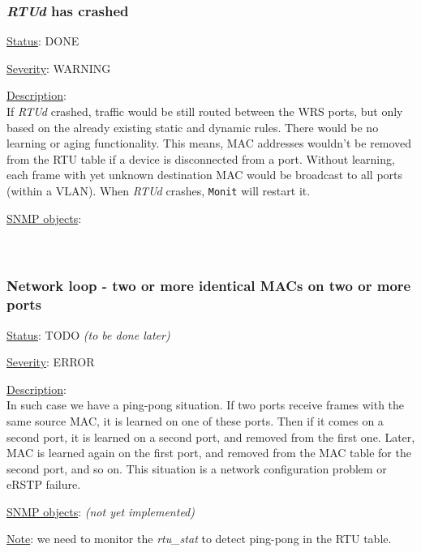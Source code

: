 \subsubsection{\bf \emph{RTUd} has crashed}
		\label{fail:data:rtu_crash}
		\begin{packed_enum}
			\item [] \underline{Status}: DONE
			\item [] \underline{Severity}: WARNING
			\item [] \underline{Description}:\\
				If \emph{RTUd} crashed, traffic would be still routed between the WRS ports, but
				only based on the already existing static and dynamic rules. There would be
				no learning or aging functionality. This means, MAC addresses wouldn't be
				removed from the RTU table if a device is disconnected from a port.
				Without learning, each frame with yet unknown destination MAC would be
				broadcast to all ports (within a VLAN). When \emph{RTUd} crashes,
				\texttt{Monit} will restart it.
			\item [] \underline{SNMP objects}:\\
				\\
				\\
		\end{packed_enum}

\subsubsection{\bf Network loop - two or more identical MACs on two or more ports}
		\label{fail:data:net_loop}
		\begin{packed_enum}
			\item [] \underline{Status}: TODO \emph{(to be done later)}
			\item [] \underline{Severity}: ERROR
			\item [] \underline{Description}:\\
				In such case we have a ping-pong situation. If two ports receive frames
				with the same source MAC, it is learned on one of these ports. Then if
				it comes on a second port, it is learned on a second port, and removed
				from the first one. Later, MAC is learned again on the first port, and
				removed from the MAC table for the second port, and so on. This
				situation is a network configuration problem or eRSTP failure.
			\item [] \underline{SNMP objects}: \emph{(not yet implemented)}
			\item [] \underline{Note}: we need to monitor the \emph{rtu\_stat} to
				detect ping-pong in the RTU table.
		\end{packed_enum}

